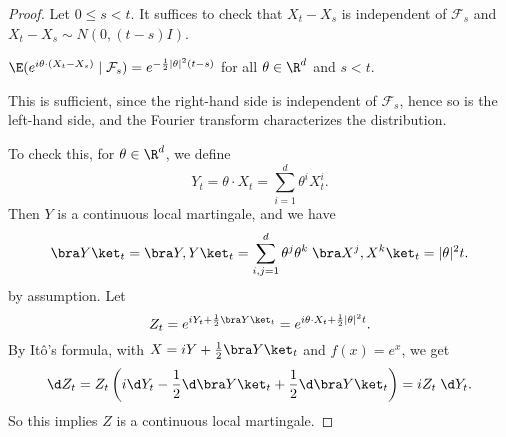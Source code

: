\documentclass[a4paper]{article}
\begin{document}
\begin{proof}
  Let $0 \leq s < t$. It suffices to check that $X_t - X_s$ is independent of $\mathcal{F}_s$ and $X_t - X_s \sim N(0, (t - s) I)$.
  \begin{claim}
    $\E(e^{i\theta \cdot (X_t - X_s)} \mid \mathcal{F}_s) = e^{-\frac{1}{2} |\theta|^2 (t - s)}$ for all $\theta \in \R^d$ and $s < t$.
  \end{claim}
  This is sufficient, since the right-hand side is independent of $\mathcal{F}_s$, hence so is the left-hand side, and the Fourier transform characterizes the distribution.

  To check this, for $\theta \in \R^d$, we define
  \[
    Y_t = \theta \cdot X_t = \sum_{i = 1}^d \theta^i X_t^i.
  \]
  Then $Y$ is a continuous local martingale, and we have
  \[
    \bra Y\ket_t = \bra Y, Y\ket_t = \sum_{i, j = 1}^d \theta^j \theta^k\; \bra X^j, X^k\ket_t = |\theta|^2 t.
  \]
  by assumption. Let
  \[
    Z_t = e^{iY_t + \frac{1}{2} \bra Y\ket_t} = e^{i \theta \cdot X_t + \frac{1}{2} |\theta|^2 t}.
  \]
  By It\^o's formula, with $X = i Y + \frac{1}{2} \bra Y\ket_t$ and $f(x) = e^x$, we get
  \[
    \d Z_t = Z_t \left(i \d Y_t - \frac{1}{2} \d \bra Y\ket_t + \frac{1}{2} \d \bra Y\ket_t\right) = i Z_t \;\d Y_t.
  \]
  So this implies $Z$ is a continuous local martingale.

\end{proof}
\printindex
\end{document}
